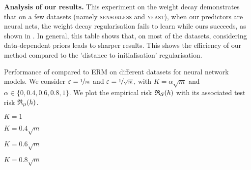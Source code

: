 \documentclass{article}
\begin{document}
\textbf{Analysis of our results.}
This experiment on the weight decay demonstrates that on a few datasets (namely \textsc{sensorless} and \textsc{yeast}), when our predictors are neural nets, the weight decay regularisation fails to learn while ours succeeds, as shown in .
In general, this table shows that, on most of the datasets, considering data-dependent priors leads to sharper results.
This shows the efficiency of our method compared to the 'distance to initialisation' regularisation.


\begin{table}[ht]
    \caption{Performance of  compared to ERM on different datasets for neural network models.
We consider $\varepsilon=\nicefrac{1}{m}$ and $\varepsilon=\nicefrac{1}{\sqrt{m}}$, with $K=\alpha\sqrt{m}$ and $\alpha\in\{0,0.4,0.6,0.8,1\}$.
We plot the empirical risk $\mathfrak{R}_{\mathcal{S}}(h)$ with its associated test risk $\mathfrak{R}_{\mu}(h)$.}
    \begin{adjustbox}{width=0.45\columnwidth}
    \begin{subtable}{0.5\textwidth}
        \centering
        \caption{$K=1$}
        
       \label{tab:sup_nn_batch_0}
    \end{subtable}\end{adjustbox}%
    \hspace{1.0cm}\begin{adjustbox}{width=0.45\columnwidth}
    \begin{subtable}{0.5\textwidth}
        \centering
        \caption{$K=0.4\sqrt{m}$}
        
        \label{tab:sup_nn_batch_4}
    \end{subtable}\end{adjustbox}
    \begin{adjustbox}{width=0.45\columnwidth}
    \begin{subtable}{0.5\textwidth}
        \centering
        \caption{$K=0.6\sqrt{m}$}
        
        \label{tab:sup_nn_batch_6}
    \end{subtable}\end{adjustbox}%
    \hspace{1.0cm}\begin{adjustbox}{width=0.45\columnwidth}
    \begin{subtable}{0.5\textwidth}
        \centering
        \caption{$K=0.8\sqrt{m}$}
        

\end{subtable}
\end{adjustbox}
\end{table}
\end{document}
